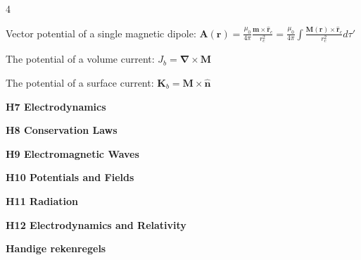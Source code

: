 \documentclass[a4paper,twoside]{article}
\newcommand{\secblock}[1]{\vspace{0.08ex}\textbf{#1}\par}
\begin{document}
\begin{multicols*}{4}

Vector potential of a single magnetic dipole:
\(\bm A (\bm r) = \frac{\mu_0}{4\pi} \frac{\bm m \times \hat{\bm r}_c}{r^2_c} = \frac{\mu_0}{4\pi} \int \frac{\bm M (\bm r) \times \hat{\bm r}_c}{r^2_c} d\tau'\)

The potential of a volume current:
\(J_b = \bm \nabla \times \bm M\)

The potential of a surface current:
\(\bm K_b = \bm M \times \hat{\bm n}\)  





\secblock{H7 Electrodynamics}


\secblock{H8 Conservation Laws}

\secblock{H9 Electromagnetic Waves}

\secblock{H10 Potentials and Fields}

\secblock{H11 Radiation}

\secblock{H12 Electrodynamics and Relativity}

\secblock{Handige rekenregels}

\end{multicols*}
\end{document}
